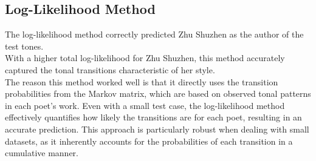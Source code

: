 \documentclass[12pt]{article}
\begin{document}
\subsection*{Log-Likelihood Method}

The log-likelihood method correctly predicted Zhu Shuzhen as the author of the test tones.
\\
\noindent With a higher total log-likelihood for Zhu Shuzhen, this method accurately captured the tonal transitions characteristic of her style. 
\\
The reason this method worked well is that it directly uses the transition probabilities from the Markov matrix, which are based on observed tonal patterns in each poet's work. Even with a small test case, the log-likelihood method effectively quantifies how likely the transitions are for each poet, resulting in an accurate prediction. 
This approach is particularly robust when dealing with small datasets, as it inherently accounts for the probabilities of each transition in a cumulative manner.
\end{document}
